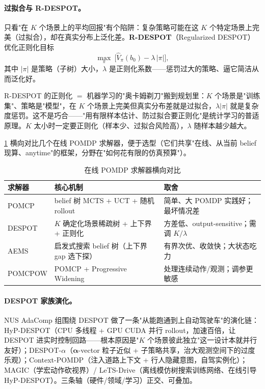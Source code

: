 \paragraph{过拟合与 R-DESPOT。}
只看"在 $K$ 个场景上的平均回报"有个陷阱：复杂策略可能在这 $K$ 个特定场景上完美（过拟合），却在真实分布上泛化差。\textbf{R-DESPOT}（Regularized DESPOT）优化正则化目标
\begin{equation}
  \max_{\pi}\ \Big[\hat V_\pi(b_0)-\lambda\,|\pi|\Big],
  \label{eq:pomdp-rdespot}
\end{equation}
其中 $|\pi|$ 是策略（子树）大小，$\lambda$ 是正则化系数——惩罚过大的策略、逼它简洁从而泛化好。

\begin{insight}
R-DESPOT 的正则化 $=$ 机器学习的"奥卡姆剃刀"搬到规划里：$K$ 个场景是"训练集"、策略是"模型"，在 $K$ 个场景上完美但真实分布差就是过拟合，$\lambda|\pi|$ 就是复杂度惩罚。这不是巧合——"用有限样本估计、防过拟合要正则化"是统计学习的普适原理。$K$ 太小时一定要正则化（样本少、过拟合风险高），$\lambda$ 随样本越少越大。
\end{insight}

\cref{tab:pomdp-online} 横向对比几个在线 POMDP 求解器，便于选型（它们共享"在线、从当前 belief 现算、anytime"的框架，分野在"如何花有限的仿真预算"）。

\begin{table}[H]\centering\small
\caption{在线 POMDP 求解器横向对比}
\label{tab:pomdp-online}
\begin{tabular}{lll}
\toprule
求解器 & 核心机制 & 取舍 \\
\midrule
POMCP\cite{silver2010pomcp} & belief 树 MCTS + UCT + 随机 rollout & 简单、大 POMDP 实践好；最坏情况差 \\
DESPOT\cite{somani2013despot} & $K$ 确定化场景稀疏树 + 上下界 + 正则化 & 方差低、output-sensitive；需调 $K/\lambda$ \\
AEMS & 启发式搜索 belief 树（上下界 gap 选下探）& 有界次优、收敛快；大状态吃力 \\
POMCPOW & POMCP + Progressive Widening & 处理连续动作/观测；调参更敏感 \\
\bottomrule
\end{tabular}
\end{table}

\paragraph{DESPOT 家族演化。}
NUS AdaComp 组围绕 DESPOT 做了一条"从能跑通到上自动驾驶车"的演化链\cite{somani2013despot}：HyP-DESPOT（CPU 多线程 + GPU CUDA 并行 rollout，加速百倍，让 DESPOT 进实时控制回路——根本原因是"$K$ 个场景彼此独立"这一设计本就并行友好）；DESPOT-$\alpha$（$\boldsymbol{\alpha}$-vector 粒子近似 + 子策略共享，治大观测空间下的过度乐观）；Context-POMDP（注入道路上下文 + 行人隐藏意图，自驾实例化）；MAGIC（学宏动作砍视界）/ LeTS-Drive（离线模仿树搜索训练网络、在线引导 HyP-DESPOT）。三条轴（硬件/领域/学习）正交、可叠加。

